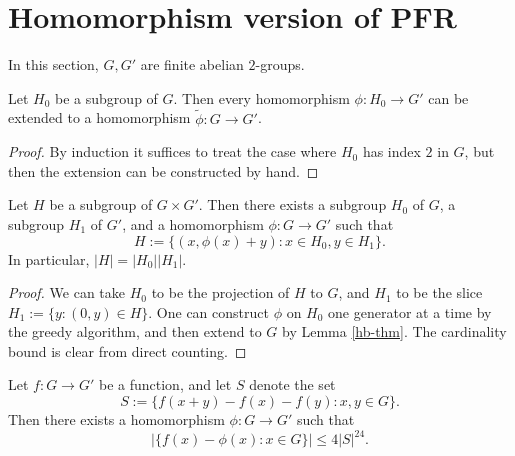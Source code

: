 \chapter{Homomorphism version of PFR}

In this section, $G, G'$ are finite abelian $2$-groups.

\begin{lemma}\label{hb-thm}\leanok  Let $H_0$ be a subgroup of $G$.  Then every homomorphism $\phi: H_0 \to G'$ can be extended to a homomorphism $\tilde \phi: G \to G'$.
\end{lemma}

\begin{proof}\leanok  By induction it suffices to treat the case where $H_0$ has index $2$ in $G$, but then the extension can be constructed by hand.
\end{proof}

\begin{lemma}\label{goursat}\leanok  Let $H$ be a subgroup of $G \times G'$.  Then there exists a subgroup $H_0$ of $G$, a subgroup $H_1$ of $G'$, and a homomorphism $\phi: G \to G'$ such that
$$ H := \{ (x, \phi(x) + y): x \in H_0, y \in H_1 \}.$$
In particular, $|H| = |H_0| |H_1|$.
\end{lemma}

\begin{proof}\leanok We can take $H_0$ to be the projection of $H$ to $G$, and $H_1$ to be the slice $H_1 := \{ y: (0,y) \in H \}$.  One can construct $\phi$ on $H_0$ one generator at a time by the greedy algorithm, and then extend to $G$ by Lemma \ref{hb-thm}.  The cardinality bound is clear from direct counting.
\end{proof}

\begin{theorem}\label{hom-pfr}\leanok  Let $f: G \to G'$ be a function, and let $S$ denote the set
$$ S := \{ f(x+y)-f(x)-f(y): x,y \in G \}.$$
Then there exists a homomorphism $\phi: G \to G'$ such that
$$ |\{ f(x) - \phi(x): x \in G \}| \leq 4 |S|^{24}.$$
\end{theorem}

